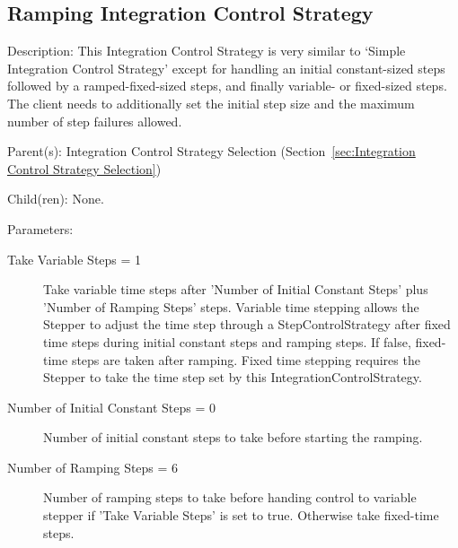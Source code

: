 \subsection{Ramping Integration Control Strategy}
\label{sec:Ramping Integration Control Strategy}

\begin{list}{}
  {\setlength{\leftmargin}{1.0in}
   \setlength{\labelwidth}{0.75in}
   \setlength{\labelsep}{0.125in}}
  \item[Description:]
    This Integration Control Strategy is very similar to `Simple Integration Control Strategy' except for handling an initial constant-sized steps followed by a ramped-fixed-sized steps, and finally variable- or fixed-sized steps.  The client needs to additionally set the initial step size and the maximum number of step failures allowed.
  \item[Parent(s):]
    Integration Control Strategy Selection (Section~\ref{sec:Integration Control Strategy Selection})
  \item[Child(ren):]
    None. 
  \item[Parameters:]
    \begin{description}
      \item[Take Variable Steps = 1] 
Take variable time steps after 'Number of Initial Constant Steps' plus 'Number of Ramping Steps' steps.  Variable time stepping allows the Stepper to adjust the time step through a StepControlStrategy after fixed time steps during initial constant steps and ramping steps.  If false, fixed-time steps are taken after ramping.  Fixed time stepping requires the Stepper to take the time step set by this IntegrationControlStrategy.
      \item[Number of Initial Constant Steps = 0] 
Number of initial constant steps to take before starting the ramping.
      \item[Number of Ramping Steps = 6] 
Number of ramping steps to take before handing control to variable stepper if 'Take Variable Steps' is set to true.  Otherwise take fixed-time steps.

\end{description}
\end{list}
